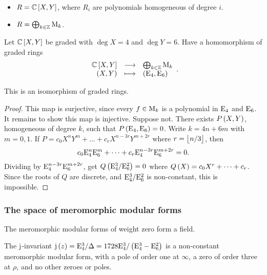 \begin{example*}
\hfill
\begin{itemize}
\item $ R = \CC\sbr{X, Y} $, where $ R_i $ are polynomials homogeneous of degree $ i $.
\item $ R = \bigoplus_{k \in \mathbb{Z}} \mathrm{M}_k $.
\end{itemize}
\end{example*}

\pagebreak

Let $ \CC\sbr{X, Y} $ be graded with $ \deg X = 4 $ and $ \deg Y = 6 $. Have a homomorphism of graded rings
$$ \function{\CC\sbr{X, Y}}{\bigoplus_{k \in \ZZ} \M_k}{\br{X, Y}}{\br{\E_4, \E_6}}. $$

\begin{theorem}
This is an isomorphism of graded rings.
\end{theorem}

\begin{proof}
This map is surjective, since every $ f \in \mathrm{M}_k $ is a polynomial in $ \mathrm{E}_4 $ and $ \mathrm{E}_6 $. It remains to show this map is injective. Suppose not. There exists $ P\br{X, Y} $, homogeneous of degree $ k $, such that $ P\br{\E_4, \E_6} = 0 $. Write $ k = 4n + 6m $ with $ m = 0, 1 $. If $ P = c_0X^nY^m + \dots + c_rX^{n - 3r}Y^{m + 2r} $ where $ r = \left\lfloor n / 3 \right\rfloor $, then
$$ c_0\mathrm{E}_4^n\mathrm{E}_6^m + \dots + c_r\mathrm{E}_4^{n - 3r}\mathrm{E}_6^{m + 2r} = 0. $$
Dividing by $ \mathrm{E}_4^{n - 3r}\mathrm{E}_6^{m + 2r} $, get $ Q\br{\E_4^3 / \E_6^2} = 0 $ where $ Q\br{X} = c_0X^r + \dots + c_r $. Since the roots of $ Q $ are discrete, and $ \mathrm{E}_4^3 / \mathrm{E}_6^2 $ is non-constant, this is impossible.
\end{proof}

\subsubsection{The space of meromorphic modular forms}

\begin{note*}
The meromorphic modular forms of weight zero form a field.
\end{note*}

\begin{example*}
The $ \mathrm{j} $-invariant $ \j\br{z} = \E_4^3 / \Delta = 1728\E_4^3 / \br{\E_4^3 - \E_6^2} $ is a non-constant meromorphic modular form, with a pole of order one at $ \infty $, a zero of order three at $ \rho $, and no other zeroes or poles.
\end{example*}

